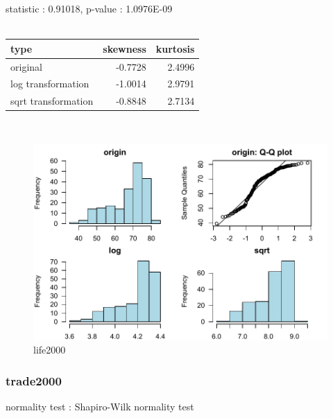 \documentclass{book}\usepackage[]{graphicx}\usepackage[]{color}
\begin{document}
\noindent statistic : 0.91018,  p-value : 1.0976E-09\\
\\%
\begin{tabular}{lrr}
  \toprule
type & skewness & kurtosis \\ 
  \midrule
original & -0.7728 & 2.4996 \\ 
  log transformation & -1.0014 & 2.9791 \\ 
  sqrt transformation & -0.8848 & 2.7134 \\ 
   \bottomrule
\end{tabular}
\\
\begin{figure}[!ht]
\centering
\includegraphics[width=1.0\textwidth]{figure/norm9.pdf}
\caption{life2000}
\end{figure}
\clearpage
\subsubsection{ trade2000 }

normality test : Shapiro-Wilk normality test
\end{document}
